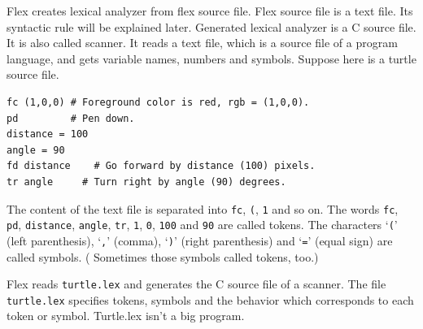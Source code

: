 Flex creates lexical analyzer from flex source file. Flex source file is
a text file. Its syntactic rule will be explained later. Generated
lexical analyzer is a C source file. It is also called scanner. It reads
a text file, which is a source file of a program language, and gets
variable names, numbers and symbols. Suppose here is a turtle source
file.

\begin{lstlisting}
fc (1,0,0) # Foreground color is red, rgb = (1,0,0).
pd         # Pen down.
distance = 100
angle = 90
fd distance    # Go forward by distance (100) pixels.
tr angle     # Turn right by angle (90) degrees.
\end{lstlisting}

The content of the text file is separated into
\passthrough{\lstinline!fc!}, \passthrough{\lstinline!(!},
\passthrough{\lstinline!1!} and so on. The words
\passthrough{\lstinline!fc!}, \passthrough{\lstinline!pd!},
\passthrough{\lstinline!distance!}, \passthrough{\lstinline!angle!},
\passthrough{\lstinline!tr!}, \passthrough{\lstinline!1!},
\passthrough{\lstinline!0!}, \passthrough{\lstinline!100!} and
\passthrough{\lstinline!90!} are called tokens. The characters
`\passthrough{\lstinline!(!}' (left parenthesis),
`\passthrough{\lstinline!,!}' (comma), `\passthrough{\lstinline!)!}'
(right parenthesis) and `\passthrough{\lstinline!=!}' (equal sign) are
called symbols. ( Sometimes those symbols called tokens, too.)

Flex reads \passthrough{\lstinline!turtle.lex!} and generates the C
source file of a scanner. The file \passthrough{\lstinline!turtle.lex!}
specifies tokens, symbols and the behavior which corresponds to each
token or symbol. Turtle.lex isn't a big program.

